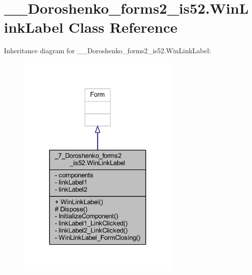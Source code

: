 \hypertarget{class__7___doroshenko__forms2__is52_1_1_win_link_label}{}\section{\+\_\+\_\+\+Doroshenko\+\_\+forms2\+\_\+is52.\+Win\+Link\+Label Class Reference}
\label{class__7___doroshenko__forms2__is52_1_1_win_link_label}


Inheritance diagram for \+\_\+\_\+\+Doroshenko\+\_\+forms2\+\_\+is52.\+Win\+Link\+Label\+:
\nopagebreak
\begin{figure}[H]
\begin{center}
\leavevmode
\includegraphics[width=227pt]{class__7___doroshenko__forms2__is52_1_1_win_link_label__inherit__graph}
\end{center}
\end{figure}


